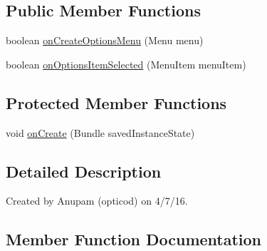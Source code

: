 \subsection*{Public Member Functions}
\begin{DoxyCompactItemize}
\item 
boolean \hyperlink{classorg_1_1buildmlearn_1_1dictation_1_1activities_1_1ResultActivity_a96358d5830ee0bbcd4753f85a079f423}{on\+Create\+Options\+Menu} (Menu menu)
\item 
boolean \hyperlink{classorg_1_1buildmlearn_1_1dictation_1_1activities_1_1ResultActivity_a89b42b9520d6f69f9f42001c73edbb3f}{on\+Options\+Item\+Selected} (Menu\+Item menu\+Item)
\end{DoxyCompactItemize}
\subsection*{Protected Member Functions}
\begin{DoxyCompactItemize}
\item 
void \hyperlink{classorg_1_1buildmlearn_1_1dictation_1_1activities_1_1ResultActivity_a92054d9d2df0ddd56322924d100b4421}{on\+Create} (Bundle saved\+Instance\+State)
\end{DoxyCompactItemize}


\subsection{Detailed Description}
Created by Anupam (opticod) on 4/7/16. 

\subsection{Member Function Documentation}
